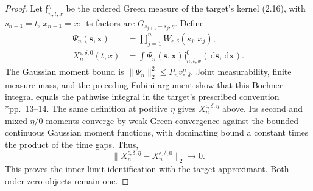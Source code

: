 \documentclass[12pt,oneside,openany]{book}
\numberwithin{equation}{section}
\theoremstyle{nogostyle}
\theoremstyle{definition}
\newcommand{\ud}{\,\mathrm{d}}
\begin{document}
\begin{proof}
  Let $\mathfrak{f}_{n,t,x}^{\eta}$ be the ordered Green measure of the target's
  kernel (2.16), with $s_{n+1} = t$, $x_{n+1} = x$: its factors are
  $G_{s_{j+1}-s_j,\eta}$. Define
  \[
    \begin{split}
      \Psi_n(\mathbf{s},\mathbf{x})
      &=\prod_{j=1}^nW_{\epsilon,\delta}(s_j,x_j),\\
      X_n^{\epsilon,\delta,0}(t,x)
      &=\int\Psi_n(\mathbf{s},\mathbf{x})
      \mathfrak{f}_{n,t,x}^{0}(\ud\mathbf{s},\ud\mathbf{x}).
    \end{split}
  \]
  The Gaussian moment bound is $\|\Psi_n\|_2^2 \le P_nv_{\epsilon,\delta}^n$.
  Joint measurability, finite measure mass, and the preceding Fubini argument
  show that this Bochner integral equals the pathwise integral in the target's
  prescribed convention \cite{chen:author2026:time-dependency}*{pp.~13--14}. The
  same definition at positive $\eta$ gives $X_n^{\epsilon,\delta,\eta}$ above.
  Its second and mixed $\eta/0$ moments converge by weak Green convergence
  against the bounded continuous Gaussian moment functions, with dominating
  bound a constant times the product of the time gaps. Thus,
  \[
    \|X_n^{\epsilon,\delta,\eta}
    -X_n^{\epsilon,\delta,0}\|_2\longrightarrow0.
  \]
  This proves the inner-limit identification with the target approximant. Both
  order-zero objects remain one.



\end{proof}
\end{document}
